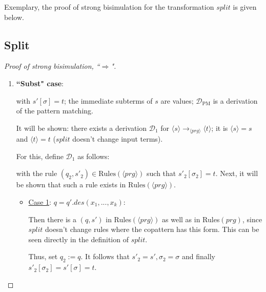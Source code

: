 \documentclass[11pt]{article} %
\begin{document}

Exemplary, the proof of strong bisimulation for the transformation $split$ is given below.

\subsection{Split}

\begin{proof}[Proof of strong bisimulation, ``$\Rightarrow$"] ~

\begin{enumerate}
\item \textbf{``Subst" case}:

\begin{prooftree}
\end{prooftree}

with $s'[\sigma] = t$; the immediate subterms of $s$ are values; $\mathcal{D}_{\textrm{PM}}$ is a derivation of the pattern matching.

It will be shown: there exists a derivation $\mathcal{D}_1$ for $\langle s \rangle \longrightarrow_{\langle prg \rangle} \langle t \rangle$; it is $\langle s \rangle = s$ and $\langle t \rangle = t$ ($split$ doesn't change input terms).

For this, define $\mathcal{D}_1$ as follows:

\begin{prooftree}
\end{prooftree}

with the rule $(q_2, s'_2) \in \textrm{Rules}(\langle prg \rangle)$ such that $s'_2[\sigma_2] = t$. Next, it will be shown that such a rule exists in $\textrm{Rules}(\langle prg \rangle)$.

\begin{itemize}
\item \underline{Case 1}: $q = q'.des(x_1, ..., x_k)$:

Then there is a $(q, s')$ in Rules$(\langle prg \rangle)$ as well as in Rules$(prg)$, since $split$ doesn't change rules where the copattern has this form. This can be seen directly in the definition of $split$.

Thus, set $q_2 := q$. It follows that $s'_2 = s', \sigma_2 = \sigma$ and finally $s'_2[\sigma_2] = s'[\sigma] = t$.


\end{itemize}
\end{enumerate}
\end{proof}
\end{document}
